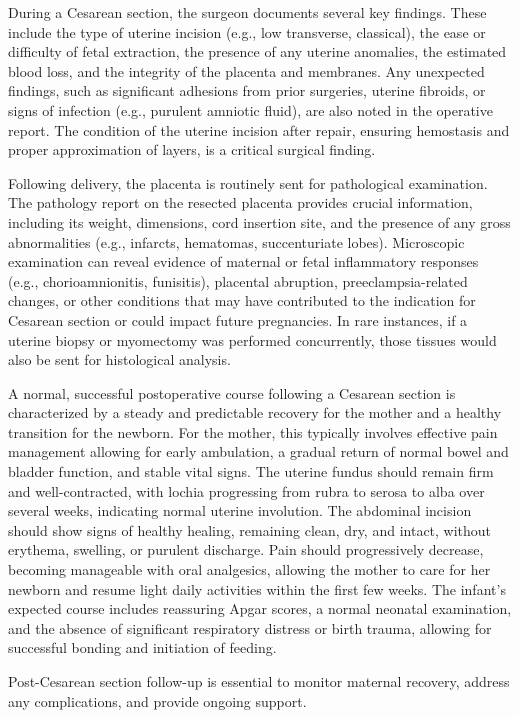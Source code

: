 During a Cesarean section, the surgeon documents several key findings. These include the type of uterine incision (e.g., low transverse, classical), the ease or difficulty of fetal extraction, the presence of any uterine anomalies, the estimated blood loss, and the integrity of the placenta and membranes. Any unexpected findings, such as significant adhesions from prior surgeries, uterine fibroids, or signs of infection (e.g., purulent amniotic fluid), are also noted in the operative report. The condition of the uterine incision after repair, ensuring hemostasis and proper approximation of layers, is a critical surgical finding.

Following delivery, the placenta is routinely sent for pathological examination. The pathology report on the resected placenta provides crucial information, including its weight, dimensions, cord insertion site, and the presence of any gross abnormalities (e.g., infarcts, hematomas, succenturiate lobes). Microscopic examination can reveal evidence of maternal or fetal inflammatory responses (e.g., chorioamnionitis, funisitis), placental abruption, preeclampsia-related changes, or other conditions that may have contributed to the indication for Cesarean section or could impact future pregnancies. In rare instances, if a uterine biopsy or myomectomy was performed concurrently, those tissues would also be sent for histological analysis.

A normal, successful postoperative course following a Cesarean section is characterized by a steady and predictable recovery for the mother and a healthy transition for the newborn. For the mother, this typically involves effective pain management allowing for early ambulation, a gradual return of normal bowel and bladder function, and stable vital signs. The uterine fundus should remain firm and well-contracted, with lochia progressing from rubra to serosa to alba over several weeks, indicating normal uterine involution. The abdominal incision should show signs of healthy healing, remaining clean, dry, and intact, without erythema, swelling, or purulent discharge. Pain should progressively decrease, becoming manageable with oral analgesics, allowing the mother to care for her newborn and resume light daily activities within the first few weeks. The infant's expected course includes reassuring Apgar scores, a normal neonatal examination, and the absence of significant respiratory distress or birth trauma, allowing for successful bonding and initiation of feeding.

Post-Cesarean section follow-up is essential to monitor maternal recovery, address any complications, and provide ongoing support.

